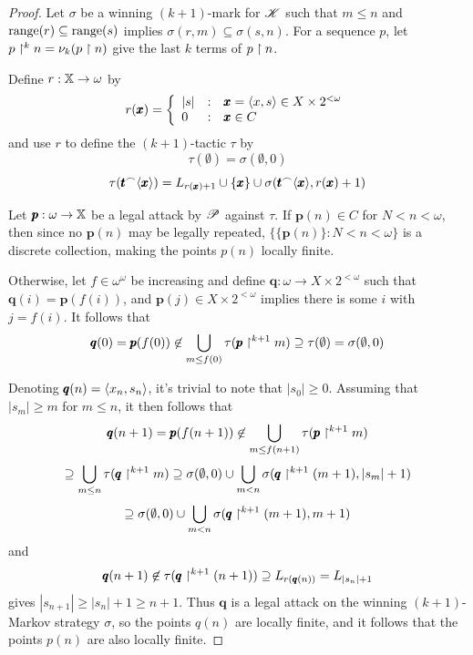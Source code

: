 \documentclass{amsart}
\theoremstyle{definition}
\begin{document}
\begin{proof}
  Let $\sigma$ be a winning $(k+1)$-mark for $\mathscr{K}$ such that $m\leq n$ and
  $\text{range}(r) \subseteq \text{range}(s)$ implies $\sigma(r,m)\subseteq\sigma(s,n)$.
  For a sequence $p$, let $p\restriction^k n=\nu_k(p\restriction n)$ give the last $k$
  terms of $p\restriction n$.

  Define $r:\mathbb{X}\to\omega$ by
    \[
      r(\pmb x)
        =
      \left\{
        \begin{array}{lcl}
          |s|
        & : &
          \pmb x = \langle x,s\rangle \in X\times 2^{<\omega}
        \\
          0
        & : &
          \pmb x \in C
        \end{array}
      \right.
    \]
  and use $r$ to define the $(k+1)$-tactic $\tau$ by
    \[
      \tau(\emptyset)
        =
      \sigma(\emptyset,0)
    \]
    \[
      \tau(\pmb t{^\frown}\langle\pmb x\rangle)
        =
      L_{r(\pmb x)+1}
        \cup
      \{\pmb x\}
        \cup
      \sigma(\pmb t{^\frown}\langle\pmb x\rangle,r(\pmb x)+1)
    \]

  Let $\pmb p:\omega\to\mathbb{X}$ be a legal attack by $\mathscr{P}$ against $\tau$.
  If $\pmb p(n)\in C$ for $N<n<\omega$, then since no $\pmb p(n)$ may be legally
  repeated, $\{\{\pmb p(n)\}:N<n<\omega\}$ is a discrete collection, making
  the points $p(n)$ locally finite.

  Otherwise, let $f\in\omega^\omega$ be increasing and define
  $\pmb q:\omega\to X\times 2^{<\omega}$ such that $\pmb q(i)=\pmb p(f(i))$,
  and $\pmb p(j)\in X\times 2^{<\omega}$ implies there is some $i$ with $j=f(i)$.
  It follows that
    \[
      \pmb q(0)
        =
      \pmb p(f(0))
        \not\in
      \bigcup_{m\leq f(0)}\tau(\pmb p \restriction^{k+1} m)
        \supseteq
      \tau(\emptyset)
        =
      \sigma(\emptyset,0)
    \]

  Denoting $\pmb q(n)=\langle x_n,s_n\rangle$, it's trivial to note that $|s_0|\geq 0$.
  Assuming that $|s_m|\geq m$ for $m\leq n$,
  it then follows that
    \[
      \pmb q(n+1)
        =
      \pmb p(f(n+1))
        \not\in
      \bigcup_{m\leq f(n+1)}\tau(\pmb p\restriction^{k+1} m)
    \]
    \[
        \supseteq
      \bigcup_{m\leq n}\tau(\pmb q\restriction^{k+1} m)
        \supseteq
      \sigma(\emptyset,0)
        \cup
      \bigcup_{m < n}\sigma(\pmb q\restriction^{k+1} (m+1),|s_m|+1)
    \]
    \[
        \supseteq
      \sigma(\emptyset,0)
        \cup
      \bigcup_{m < n}\sigma(\pmb q\restriction^{k+1} (m+1),m+1)
    \]
  and
    \[
      \pmb q(n+1)
        \not\in
      \tau(\pmb q\restriction^{k+1} (n+1))
        \supseteq
      L_{r(\pmb q(n))}
        =
      L_{|s_n|+1}
    \]
  gives $|s_{n+1}|\geq|s_n|+1\geq n+1$.
  Thus $\pmb q$ is a legal attack on the winning $(k+1)$-Markov strategy
  $\sigma$, so the points $q(n)$ are locally finite,
  and it follows that the points $p(n)$ are also locally finite.
\end{proof}
\end{document}
